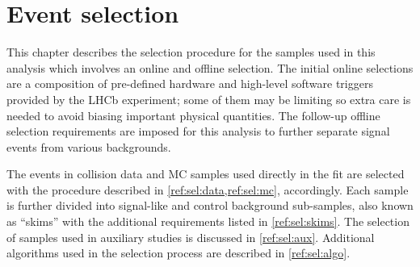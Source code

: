 \chapter{Event selection}
\label{ref:sel}

This chapter describes the selection procedure for the samples used in this
analysis which involves an online and offline selection.
The initial online selections are a composition of
pre-defined hardware and high-level software triggers provided by the LHCb
experiment;
some of them may be limiting so extra care is needed to avoid biasing important
physical quantities.
The follow-up offline selection requirements are imposed for this analysis
to further separate signal events from various backgrounds.

The events in collision data and MC samples used directly in the fit are
selected with the procedure
described in \cref{ref:sel:data,ref:sel:mc}, accordingly.
Each sample is further divided into signal-like and control background
sub-samples, also known as ``skims''
with the additional requirements listed in \cref{ref:sel:skims}.
The selection of samples used in auxiliary studies is discussed in
\cref{ref:sel:aux}.
Additional algorithms used in the selection process are described in
\cref{ref:sel:algo}.







